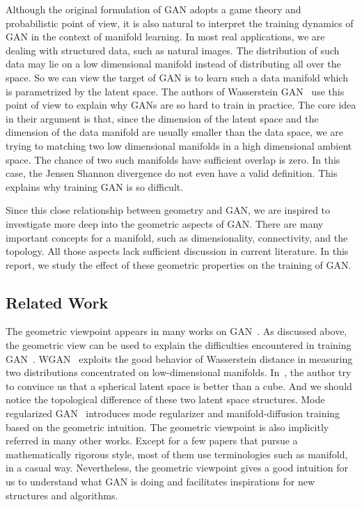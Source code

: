 Although the original formulation of GAN
adopts a game theory and probabilistic point of view,
it is also natural to interpret the training dynamics of GAN
in the context of manifold learning.
In most real applications,
we are dealing with structured data,
such as natural images.
The distribution of such data may lie on a low dimensional manifold
instead of distributing all over the space.
So we can view the target of GAN is to learn such a data manifold
which is parametrized by the latent space.
The authors of Wasserstein GAN~\cite{arjovsky2017towards,arjovsky2017wasserstein}
use this point of view to explain
why GANs are so hard to train in practice.
The core idea in their argument is that,
since the dimension of the latent space and the dimension of the data manifold
are usually smaller than the data space,
we are trying to matching two low dimensional manifolds in a high dimensional
ambient space.
The chance of two such manifolds have sufficient overlap is zero.
In this case,
the Jensen Shannon divergence do not even have a valid definition.
This explains why training GAN is so difficult.

Since this close relationship between geometry and GAN,
we are inspired to investigate more deep into the geometric aspects of GAN.
There are many important concepts for a manifold,
such as dimensionality,
connectivity,
and the topology.
All those aspects lack sufficient discussion in current literature.
In this report,
we study the effect of these geometric properties on the training of GAN.

\subsection{Related Work}

The geometric viewpoint appears in many works on
GAN~\cite{arjovsky2017towards,zhao2016energy,
arjovsky2017wasserstein,che2016mode,zhu2017unpaired,zhu2016generative}.
As discussed above,
the geometric view can be used to explain the difficulties encountered in
training GAN~\cite{arjovsky2017towards}.
WGAN~\cite{arjovsky2017wasserstein} exploits the good behavior of
Wasserstein distance in measuring two distributions concentrated on
low-dimensional manifolds.
In~\cite{white2016sampling},
the author try to convince us that a spherical latent space is
better than a cube.
And we should notice the topological difference of
these two latent space structures.
Mode regularized GAN~\cite{che2016mode} introduces mode regularizer and
manifold-diffusion training based on the geometric intuition.
The geometric viewpoint is also implicitly referred in many other works.
Except for a few papers that pursue a mathematically rigorous style,
most of them use terminologies such as manifold,
in a casual way.
Nevertheless,
the geometric viewpoint gives a good intuition for us to understand
what GAN is doing and facilitates inspirations for new structures and algorithms.
